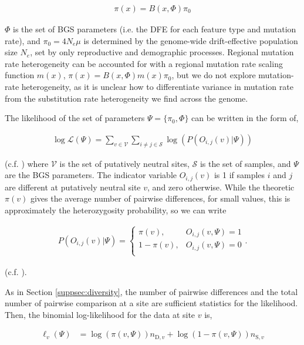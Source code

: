 \documentclass[11pt]{article}
\begin{document}
\begin{align}
  \pi(x) = B(x, \Phi) \pi_0
\end{align}

$\Phi$ is the set of BGS parameters (i.e. the DFE for each feature type and
mutation rate), and $\pi_0 = 4 N_e \mu$ is determined by the genome-wide
drift-effective population size $N_e$, set by only reproductive and demographic
processes. Regional mutation rate heterogeneity can be accounted for with a
regional mutation rate scaling function $m(x)$, $\pi(x) = B(x, \Phi) m(x)
\pi_0$, but we do not explore mutation-rate heterogeneity, as it is unclear how
to differentiate variance in mutation rate from the substitution rate
heterogeneity we find across the genome.

The likelihood of the set of parameters $\Psi = \{\pi_0, \Phi\}$ can be written
in the form of, 

\begin{align}
  \log\mathcal{L}(\Psi) = \sum_{v \in \mathcal{V}} \sum_{i \ne j \in \mathcal{S}} \log(P(O_{i,j}(v) | \Psi))
\end{align}

(c.f. \cite{McVicker2009-ax,Elyashiv2016-vt,Murphy2022-sj}) where $\mathcal{V}$
is the set of putatively neutral sites, $\mathcal{S}$ is the set of samples,
and $\Psi$ are the BGS parameters. The indicator variable $O_{i,j}(v)$ is 1 if
samples $i$ and $j$ are different at putatively neutral site $v$, and zero
otherwise. While the theoretic $\pi(v)$ gives the average number of pairwise
differences, for small values, this is approximately the heterozygosity
probability, so we can write

\begin{align}
  P(O_{i,j}(v) | \Psi) = 
    \begin{cases}
      \pi(v), & O_{i,j}(v, \Psi) = 1 \\
      1-\pi(v), & O_{i,j}(v, \Psi) = 0 \\
    \end{cases}.
\end{align}

(c.f. \cite{Elyashiv2016-vt}). 

As in Section \ref{suppsec:diversity}, the number of pairwise differences and
the total number of pairwise comparison at a site are sufficient statistics for
the likelihood. Then, the binomial log-likelihood for the data at site $v$ is,

\begin{align}
  \ell_v(\Psi) &= \log(\pi(v, \Psi)) n_{\text{D},v} + \log(1-\pi(v, \Psi)) n_{\text{S},{v}}
\end{align}
\end{document}
